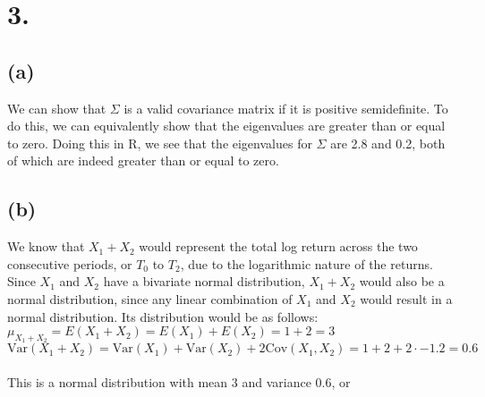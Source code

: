 \documentclass{article}
\begin{document}
\section*{3.}
{\Large 

\subsection*{(a)}

We can show that $\Sigma$ is a valid covariance matrix if it is positive semidefinite. To do this, we can equivalently show that the eigenvalues are greater than or equal to zero. Doing this in R, we see that the eigenvalues for $\Sigma$ are 2.8 and 0.2, both of which are indeed greater than or equal to zero.

\subsection*{(b)}

We know that $X_1 + X_2$ would represent the total log return across the two consecutive periods, or $T_0$ to $T_2$, due to the logarithmic nature of the returns. Since $X_1$ and $X_2$ have a bivariate normal distribution, $X_1 + X_2$ would also be a normal distribution, since any linear combination of $X_1$ and $X_2$ would result in a normal distribution. Its distribution would be as follows: \\
$\mu_{X_1 + X_2} = E(X_1 + X_2) = E(X_1) + E(X_2) = 1 + 2 = 3$ \\
$\text{Var}(X_1 + X_2) = \text{Var}(X_1) + \text{Var}(X_2) + 2\text{Cov}(X_1, X_2) = 1 + 2 + 2 \cdot -1.2 = 0.6$ \\ \\ 
This is a normal distribution with mean 3 and variance 0.6, or 

}
\end{document}
